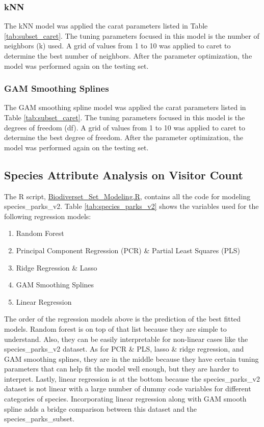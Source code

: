 \documentclass[stu, floatsintext, 11pt]{apa7}
\begin{document}
\subsubsection{kNN}
The kNN model was applied the carat parameters listed in Table \ref{tab:subset_caret}. The tuning parameters focused in this model is the number of neighbors (k) used. A grid of values from 1 to 10 was applied to caret to determine the best number of neighbors. After the parameter optimization, the model was performed again on the testing set.

\subsubsection{GAM Smoothing Splines}
The GAM smoothing spline model was applied the carat parameters listed in Table \ref{tab:subset_caret}. The tuning parameters focused in this model is the degrees of freedom (df). A grid of values from 1 to 10 was applied to caret to determine the best degree of freedom. After the parameter optimization, the model was performed again on the testing set.

\subsection{Species Attribute Analysis on Visitor Count}
The R script, \href{https://github.com/ohkaaaaay/NP_Biodiversity/blob/main/Biodiverset_Set_Modeling.R}{Biodiverset\_Set\_Modeling.R}, contains all the code for modeling species\_parks\_v2. Table \ref{tab:species_parks_v2} shows the variables used for the following regression models: 
\begin{enumerate}
    \item Random Forest
    \item Principal Component Regression (PCR) \& Partial Least Squares (PLS)
    \item Ridge Regression \& Lasso
    \item GAM Smoothing Splines
    \item Linear Regression
\end{enumerate}

The  order of the regression models above is the prediction of the best fitted models. Random forest is on top of that list because they are simple to understand. Also, they can be easily interpretable for non-linear cases like the species\_parks\_v2 dataset. As for PCR \& PLS, lasso \& ridge regression, and GAM smoothing splines, they are in the middle because they have certain tuning parameters that can help fit the model well enough, but they are harder to interpret. Lastly, linear regression is at the bottom because the species\_parks\_v2 dataset is not linear with a large number of dummy code variables for different categories of species. Incorporating linear regression along with GAM smooth spline adds a bridge comparison between this dataset and the species\_parks\_subset. \\
\end{document}
